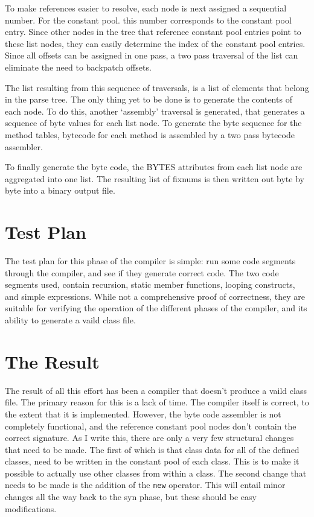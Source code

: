 \documentclass{article}[1994/05/24]
\begin{document}
	To make references easier to resolve, each node is next assigned
a sequential number.  For the constant pool. this number corresponds
to the constant pool entry.  Since other nodes in the tree that
reference constant pool entries point to these list nodes, they can
easily determine the index of the constant pool entries.  Since all 
offsets can be assigned in one pass, a two pass traversal of the list
can eliminate the need to backpatch offsets.

	The list resulting from this sequence of traversals, is a
list of elements that belong in the parse tree.  The only thing yet to
be done is to generate the contents of each node.  To do this, 
another `assembly' traversal is generated, that generates a sequence
of byte values for each list node.  To generate the byte sequence for
the method tables, bytecode for each method is assembled by a two pass
bytecode assembler.

	To finally generate the byte code, the BYTES attributes
from each list node are aggregated into one list.  The resulting
list of fixnums is then written out byte by byte into a binary
output file.

\section{Test Plan}

	The test plan for this phase of the compiler is simple:
run some code segments through the compiler, and see if they generate
correct code.  The two code segments used, contain recursion, static
member functions, looping constructs, and simple expressions.  While
not a comprehensive proof of correctness, they are suitable for verifying
the operation of the different phases of the compiler, and its ability
to generate a vaild class file.

\section{The Result}

	The result of all this effort has been a compiler that doesn't
produce a vaild class file.  The primary reason for this is a lack
of time.  The compiler itself is correct, to the extent that it is 
implemented.  However, the byte code assembler is not completely
functional, and the reference constant pool nodes don't contain the
correct signature.  As I write this, there are only a very few 
structural changes that need to be made. The first of which is that
class data for all of the defined classes, need to be written in the
constant pool of each class.  This is to make it possible to actually use
other classes from within a class.  The second change that needs to be
made is the addition of the \verb|new| operator. This will entail minor
changes all the way back to the syn phase, but these should be easy
modifications.
\end{document}
